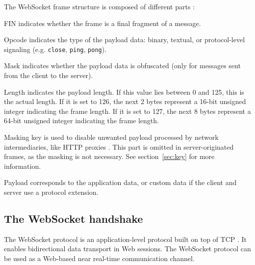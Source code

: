 \documentclass[10pt,journal,compsoc]{IEEEtran}
\newcommand{\ttt}[1]{\texttt{#1}}
\newcommand{\ws}{WebSocket}
\begin{document}
The \ws{} frame structure is composed of different parts \cite{HighPerfBrowserNetworking:websocket} \cite{performanceEvaluationOfWebsocketProtocol} :
\begin{LaTeXdescription}    %
    \item[FIN] indicates whether the frame is a final fragment of a message.
    \item[Opcode] indicates the type of the payload data: binary, textual, or protocol-level signaling (e.g. \ttt{close}, \ttt{ping}, \ttt{pong}).
    \item[Mask] indicates whether the payload data is obfuscated (only for messages sent from the client to the server).
    \item[Length] indicates the payload length. If this value lies between 0 and 125, this is the actual length.
                    If it is set to 126, the next 2 bytes represent a 16-bit unsigned integer indicating the frame length.
                    If it is set to 127, the next 8 bytes represent a 64-bit unsigned integer indicating the frame length.
    \item[Masking key] is used to disable unwanted payload processed by network intermediaries, like HTTP proxies \cite{performanceEvaluationOfWebsocketProtocol}.
                    This part is omitted in server-originated frames, as the masking is not necessary. See section~\ref{sec:key} for more information.
    \item[Payload] corresponds to the application data, or custom data if the client and server use a protocol extension.
\end{LaTeXdescription}




\subsection{The \ws{} handshake}
\label{handshake}
The \ws{} protocol is an application-level protocol built on top of TCP \cite{rfc6455}.
It enables bidirectional data transport in Web sessions.
The \ws{} protocol can be used as a Web-based near real-time communication channel.
\end{document}
